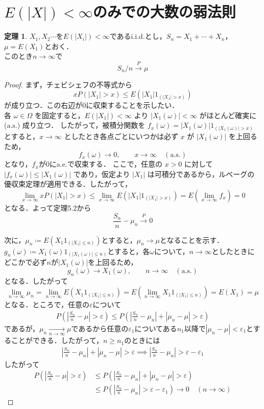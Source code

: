 \documentclass[dvipdfmx]{jsarticle}
\numberwithin{equation}{section}
\theoremstyle{definition}
\newtheorem{thm}{定理}[section]
\newcommand{\0}{\bm{0}}
\newcommand{\1}{\bm{1}}
\begin{document}
\section{$E(|X|)<\infty$のみでの大数の弱法則}
\begin{thm}
$X_1,X_2\cdots$を$E(|X_i|)<\infty$であるi.i.d.とし，$S_n=X_1+\cdots+X_n$，$\mu=E(X_1)$とおく．\\このとき$n\to\infty$で
\[
S_n/n\xrightarrow{P}\mu
\]
\end{thm}
\begin{proof}
まず，チェビシェフの不等式から
\[
  xP(|X_1| > x) \le E\!\left(|X_1| 1_{(|X_1|>x)}\right)
\]
が成り立つ．この右辺が0に収束することを示したい．\\
各 $\omega \in \Omega$ を固定すると，$E(|X_1|) < \infty$ より $|X_1(\omega)| < \infty$ がほとんど確実に ($\text{a.s.}$) 成り立つ．
したがって，被積分関数を $f_x(\omega) = |X_1(\omega)| 1_{(|X_1(\omega)|>x)}$ とすると，$x \to \infty$ としたとき各点ごとにいつかは必ず $x$ が $|X_1(\omega)|$ を上回るため，
\[
  f_x(\omega) \to 0, \qquad x \to \infty \quad (\text{a.s.})
\]
となり，$f_x$が$0$にa.e.で収束する．
ここで，任意の $x > 0$ に対して $|f_x(\omega)| \le |X_1(\omega)|$ であり，仮定より $|X_1|$ は可積分であるから，ルベーグの優収束定理が適用できる．したがって，
\[
  \lim_{x \to \infty} xP(|X_1| > x) \le \lim_{x \to \infty} E\!\left(|X_1| 1_{(|X_1|>x)}\right) = E\left(\lim_{x \to \infty} f_x\right) = 0
\]
となる．よって定理5.2から
\[
\frac{S_n}{n}-\mu_n\xrightarrow{P} 0
\]

次に，$\mu_n\coloneqq E(X_1 1_{(|X_1|\leq n)})$とすると，$\mu_n\to\mu$となることを示す．$g_n(\omega)\coloneq X_1(\omega) 1_{(|X_1(\omega)| \le n)}$とすると，各$\omega$について，$n\to\infty$としたときにどこかで必ず$n$が$|X_1(\omega)|$を上回るため，
\[
  g_n(\omega)\to X_1(\omega), \qquad n\to\infty \quad (\text{a.s.})
\]
となる．したがって
\[
  \lim_{n\to\infty}\mu_n=\lim_{n\to\infty} E\left(X_1 1_{(|X_1|\leq n)}\right)=E\left(\lim_{n\to\infty}X_1 1_{(|X_1|\leq n)}\right)=E(X_1)=\mu
\]
となる．ところで，任意の$\varepsilon$について
\begin{align*}
P\left(\left|\frac{S_n}{n}-\mu\right|>\varepsilon \right)\le P\left(\left|\frac{S_n}{n}-\mu_n\right|+\left|\mu_n-\mu\right|>\varepsilon\right)
\end{align*}
であるが，$\mu_n\xrightarrow[n\to\infty]{}\mu$であるから任意の$\varepsilon_1$についてある$n_1$以降で$|\mu_n-\mu|<\varepsilon_1$とすることができる．したがって，$n\ge n_1$のときには
\begin{align*}
\left|\frac{S_n}{n}-\mu_n\right|+\left|\mu_n-\mu\right|>\varepsilon \implies \left|\frac{S_n}{n}-\mu_n\right|>\varepsilon-\varepsilon_1
\end{align*}
したがって
\begin{align*}
P\left(\left|\frac{S_n}{n}-\mu\right| >\varepsilon\right)&\le P\left(\left|\frac{S_n}{n}-\mu_n\right|+\left|\mu_n-\mu\right|>\varepsilon\right)\\
&\le P\left(\left|\frac{S_n}{n}- \mu_n\right|>\varepsilon-\varepsilon_1\right)\longrightarrow 0 \quad (n\to\infty)
\end{align*}
\end{proof}
\end{document}
